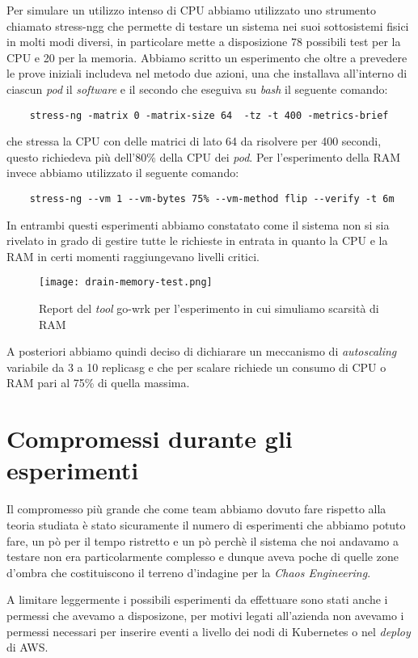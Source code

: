 Per simulare un utilizzo intenso di CPU abbiamo utilizzato uno strumento chiamato \gls{stress-ngg} che permette di testare un sistema nei suoi sottosistemi fisici in molti modi diversi, in particolare mette a disposizione 78 possibili test per la CPU e 20 per la memoria.
Abbiamo scritto un esperimento che oltre a prevedere le prove iniziali includeva nel metodo due azioni, una che installava all'interno di ciascun \textit{pod} il \textit{software} e il secondo che eseguiva su \textit{bash} il seguente comando:
\begin{verbatim}
    stress-ng -matrix 0 -matrix-size 64  -tz -t 400 -metrics-brief
\end{verbatim}
che stressa la CPU con delle matrici di lato 64 da risolvere per 400 secondi, questo richiedeva più dell'80\% della CPU dei \textit{pod}.
Per l'esperimento della RAM invece abbiamo utilizzato il seguente comando:
\begin{verbatim}
    stress-ng --vm 1 --vm-bytes 75% --vm-method flip --verify -t 6m
\end{verbatim}

In entrambi questi esperimenti abbiamo constatato come il sistema non si sia rivelato in grado di gestire tutte le richieste in entrata in quanto la CPU e la RAM in certi momenti raggiungevano livelli critici.
\begin{figure}[H]
    \centering
    \texttt{[image: drain-memory-test.png]}
    \caption{Report del \textit{tool} go-wrk per l'esperimento in cui simuliamo scarsità di RAM}
    \label{tab:report-drain-ram}
\end{figure}
A posteriori abbiamo quindi deciso di dichiarare un meccanismo di \textit{autoscaling} variabile da 3 a 10 \gls{replicasg} e che per scalare richiede un consumo di CPU o RAM pari al 75\% di quella massima.

\section{Compromessi durante gli esperimenti}
Il compromesso più grande che come team abbiamo dovuto fare rispetto alla teoria studiata è stato sicuramente il numero di esperimenti che abbiamo potuto fare, un pò per il tempo ristretto e un pò perchè il sistema che noi andavamo a testare non era particolarmente complesso e dunque aveva poche di quelle zone d'ombra che costituiscono il terreno d'indagine per la \textit{Chaos Engineering}.

A limitare leggermente i possibili esperimenti da effettuare sono stati anche i permessi che avevamo a disposizone, per motivi legati all'azienda non avevamo i permessi necessari per inserire eventi a livello dei nodi di Kubernetes o nel \textit{deploy} di AWS.

